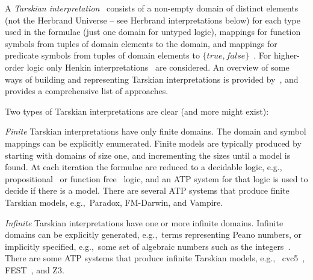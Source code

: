 \documentclass{ceurart}
\newenvironment{packed_enumerate}{
\vspace*{-0.3em}
\begin{enumerate}
\setlength{\partopsep}{0pt}
\setlength{\itemsep}{1pt}
\setlength{\parskip}{0pt}
\setlength{\parsep}{0pt}
}{\end{enumerate}}
\begin{document}
A \emph{Tarskian interpretation}~\cite{TV56} consists of a non-empty domain of distinct elements 
(not the Herbrand Universe -- see Herbrand interpretations below) for each type used in the 
formulae (just one domain for untyped logic), mappings for function symbols from tuples of 
domain elements to the domain, and mappings for predicate symbols from tuples of domain elements 
to $\{\textit{true},\textit{false}\}$~\cite{Hun96,Gal15}.
For higher-order logic only Henkin interpretations~\cite{Hen50} are considered.
An overview of some ways of building and representing Tarskian interpretations is provided 
by~\cite{CLP04}, and~\cite{Pel03-EQMC} provides a comprehensive list of approaches.

Two types of Tarskian interpretations are clear (and more might exist):
\begin{packed_enumerate}
\item \emph{Finite} Tarskian interpretations have only finite domains.
      The domain and symbol mappings can be explicitly enumerated.
      Finite models are typically produced by starting with domains of size one, and incrementing 
      the sizes until a model is found.
      At each iteration the formulae are reduced to a decidable logic, e.g.,~
      propositional~\cite{CS03,McC03-MACE4-TR} or function free~\cite{BF+09} logic, and an ATP 
      system for that logic is used to decide if there is a model.
      There are several ATP systems that produce finite Tarskian models, e.g.,~Paradox, FM-Darwin, 
      and Vampire.
\item \emph{Infinite} Tarskian interpretations have one or more infinite domains.
      Infinite domains can be explicitly generated, e.g.,~terms representing Peano numbers, or 
      implicitly specified, e.g.,~some set of algebraic numbers such as the integers~\cite{BB13}.
      There are some ATP systems that produce infinite Tarskian models, e.g.,~
      cvc5~\cite{BB+22-cvc5}, FEST~\cite{EPS24}, and Z3.
\end{packed_enumerate}
\end{document}
